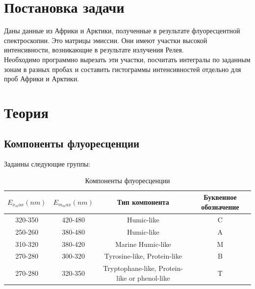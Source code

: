 
\usepackage{amsmath}




\renewcommand\contentsname{\centerline{Содержание}}
\tableofcontents
\newpage

\listoftables
\newpage

\listoffigures
\newpage

\section{Постановка задачи}
Даны данные из Африки и Арктики, полученные в результате флуоресцентной спектроскопии. Это матрицы эмиссии. Они имеют участки высокой интенсивности, возникающие в результате излучения Релея. \\
Необходимо программно вырезать эти участки, посчитать интегралы по заданным зонам в разных пробах и составить гистограммы интенсивностей отдельно для проб Африки и Арктики.

\section{Теория}
\subsection{Компоненты флуоресценции}
Заданны следующие группы:
\begin{table}[!ht]
	\centering
		\begin{tabular} {|c|c|c|c|}
			\hline
			$E_{x_max}(nm)$ & $E_{m_max}(nm)$ & Тип компонента & Буквенное обозначение \\ \hline
			 320-350 & 420-480 & Humic-like & C \\ \hline
			 250-260 & 380-480 & Humic-like & A \\ \hline
			 310-320 & 380-420 & Marine Humic-like & M \\ \hline
			 270-280 & 300-320 & Tyrosine-like, Protein-like & B \\ \hline
			 270-280 & 320-350 & Tryptophane-like, Protein-like or phenol-like & T \\ \hline
		\end{tabular}
		\caption{Компоненты флуоресценции}
\end{table}

